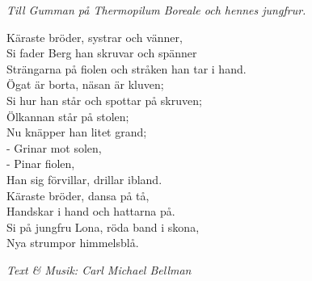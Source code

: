 {\footnotesize\textit{Till Gumman på Thermopilum Boreale och hennes jungfrur.}}\par
\vspace{10pt}
Käraste bröder, systrar och vänner,\\
Si fader Berg han skruvar och spänner\\
Strängarna på fiolen och stråken han tar i hand.\\
Ögat är borta, näsan är kluven;\\
Si hur han står och spottar på skruven;\\
Ölkannan står på stolen;\\
Nu knäpper han litet grand;\\
- Grinar mot solen,\\
- Pinar fiolen,\\
Han sig förvillar, drillar ibland.\\
Käraste bröder, dansa på tå,\\
Handskar i hand och hattarna på.\\
Si på jungfru Lona, röda band i skona,\\
Nya strumpor himmelsblå.\par
\vspace{10pt}
{\footnotesize\textit{Text \& Musik: Carl Michael Bellman}}
